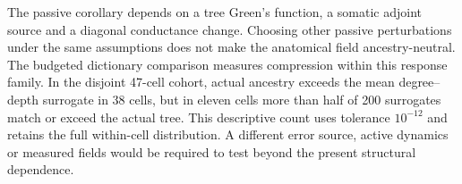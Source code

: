 The passive corollary depends on a tree Green's function, a somatic adjoint source and a diagonal conductance change. Choosing other passive perturbations under the same assumptions does not make the anatomical field ancestry-neutral. The budgeted dictionary comparison measures compression within this response family. In the disjoint 47-cell cohort, actual ancestry exceeds the mean degree--depth surrogate in 38 cells, but in eleven cells more than half of 200 surrogates match or exceed the actual tree. This descriptive count uses tolerance $10^{-12}$ and retains the full within-cell distribution. A different error source, active dynamics or measured fields would be required to test beyond the present structural dependence.
